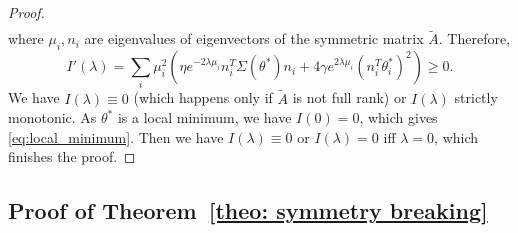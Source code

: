 \documentclass{article}
\theoremstyle{plain}
\begin{document}
\begin{proof}
\begin{equation}
\begin{aligned}
\end{aligned}
\end{equation}
where $\mu_i,n_i$ are eigenvalues of eigenvectors of the symmetric matrix $\tilde{A}$. Therefore,
\begin{equation}
I'(\lambda)=\sum_i\mu_i^2(\eta e^{-2\lambda\mu_i}n_i^T\Sigma(\theta^*)n_i+4\gamma e^{2\lambda\mu_i}(n_i^T\theta_i^*)^2)\geq0.
\end{equation}
We have $I(\lambda)\equiv0$ (which happens only if $\tilde{A}$ is not full rank) or $I(\lambda)$ strictly monotonic. As $\theta^*$ is a local minimum, we have $I(0)=0$, which gives \eqref{eq:local_minimum}. Then we have $I(\lambda)\equiv0$ or $I(\lambda)=0$ iff $\lambda=0$, which finishes the proof.
\end{proof}

\subsection{Proof of Theorem~\ref{theo: symmetry breaking}}
\end{document}
